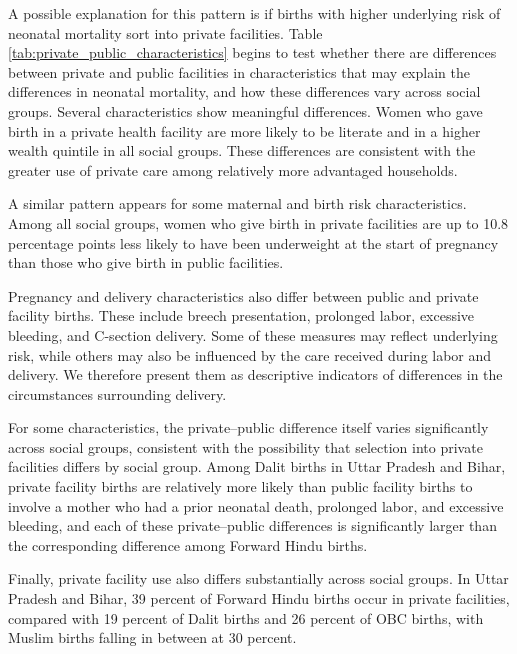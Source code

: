 \documentclass[12pt]{article}
\begin{document}
A possible explanation for this pattern is if births with higher underlying risk of neonatal mortality sort into private facilities. Table \ref{tab:private_public_characteristics} begins to test whether there are differences between private and public facilities in characteristics that may explain the differences in neonatal mortality, and how these differences vary across social groups. Several characteristics show meaningful differences. Women who gave birth in a private health facility are more likely to be literate and in a higher wealth quintile in all social groups. These differences are consistent with the greater use of private care among relatively more advantaged households.

A similar pattern appears for some maternal and birth risk characteristics. Among all social groups, women who give birth in private facilities are up to 10.8 percentage points less likely to have been underweight at the start of pregnancy than those who give birth in public facilities. 

Pregnancy and delivery characteristics also differ between public and private facility births. These include breech presentation, prolonged labor, excessive bleeding, and C-section delivery. Some of these measures may reflect underlying risk, while others may also be influenced by the care received during labor and delivery. We therefore present them as descriptive indicators of differences in the circumstances surrounding delivery.

For some characteristics, the private–public difference itself varies significantly across social groups, consistent with the possibility that selection into private facilities differs by social group. Among Dalit births in Uttar Pradesh and Bihar, private facility births are relatively more likely than public facility births to involve a mother who had a prior neonatal death, prolonged labor, and excessive bleeding, and each of these private–public differences is significantly larger than the corresponding difference among Forward Hindu births.

Finally, private facility use also differs substantially across social groups. In Uttar Pradesh and Bihar, 39 percent of Forward Hindu births occur in private facilities, compared with 19 percent of Dalit births and 26 percent of OBC births, with Muslim births falling in between at 30 percent.


\end{document}
